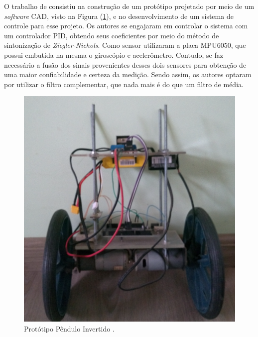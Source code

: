O trabalho de \cite{CCEL:17} consistiu na construção de um protótipo projetado por meio de um \textit{software} CAD, visto na Figura (\ref{fig:estadoArte_REF1}), e no desenvolvimento de um sistema de controle para esse projeto. Os autores se engajaram em controlar o sistema com um controlador PID, obtendo seus coeficientes por meio do método de sintonização de \textit{Ziegler-Nichols}. Como sensor utilizaram a placa MPU6050, que possui embutida na mesma o giroscópio e acelerômetro. Contudo, se faz necessário a fusão dos sinais provenientes desses dois sensores para obtenção de uma maior confiabilidade e certeza da medição. Sendo assim, os autores optaram por utilizar o filtro complementar, que nada mais é do que um filtro de média. 
\begin{figure}[H]
    \centering
    \includegraphics[scale=0.6]{EstadoArte/REF1}
    \caption{Protótipo Pêndulo Invertido
    \citep{CCEL:17}.}
    \label{fig:estadoArte_REF1}
\end{figure}

